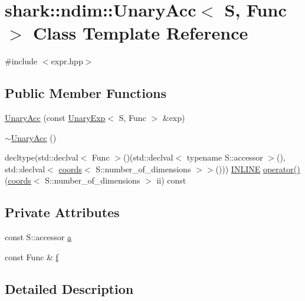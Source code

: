\hypertarget{classshark_1_1ndim_1_1_unary_acc}{}\section{shark\+:\+:ndim\+:\+:Unary\+Acc$<$ S, Func $>$ Class Template Reference}
\label{classshark_1_1ndim_1_1_unary_acc}


{\ttfamily \#include $<$expr.\+hpp$>$}

\subsection*{Public Member Functions}
\begin{DoxyCompactItemize}
\item 
\hyperlink{classshark_1_1ndim_1_1_unary_acc_a776fc8713e13051d4fb52eeef18c067f}{Unary\+Acc} (const \hyperlink{classshark_1_1ndim_1_1_unary_exp}{Unary\+Exp}$<$ S, Func $>$ \&exp)
\item 
\hyperlink{classshark_1_1ndim_1_1_unary_acc_a4069b14973b6098c878dd467d695f7a7}{$\sim$\+Unary\+Acc} ()
\item 
decltype(std\+::declval$<$ Func $>$()(std\+::declval$<$ typename S\+::accessor $>$(), std\+::declval$<$ \hyperlink{structshark_1_1ndim_1_1coords}{coords}$<$ S\+::number\+\_\+of\+\_\+dimensions $>$$>$())) \hyperlink{common_8hpp_a2eb6f9e0395b47b8d5e3eeae4fe0c116}{I\+N\+L\+I\+NE} \hyperlink{classshark_1_1ndim_1_1_unary_acc_ab9a95cebe1e0acf123a375b32743453b}{operator()} (\hyperlink{structshark_1_1ndim_1_1coords}{coords}$<$ S\+::number\+\_\+of\+\_\+dimensions $>$ ii) const
\end{DoxyCompactItemize}
\subsection*{Private Attributes}
\begin{DoxyCompactItemize}
\item 
const S\+::accessor \hyperlink{classshark_1_1ndim_1_1_unary_acc_af254b8e0cfc968269a4e03d80f45a4eb}{a}
\item 
const Func \& \hyperlink{classshark_1_1ndim_1_1_unary_acc_a8a6488ae3b1f64726413bd49721e05b3}{f}
\end{DoxyCompactItemize}


\subsection{Detailed Description}
